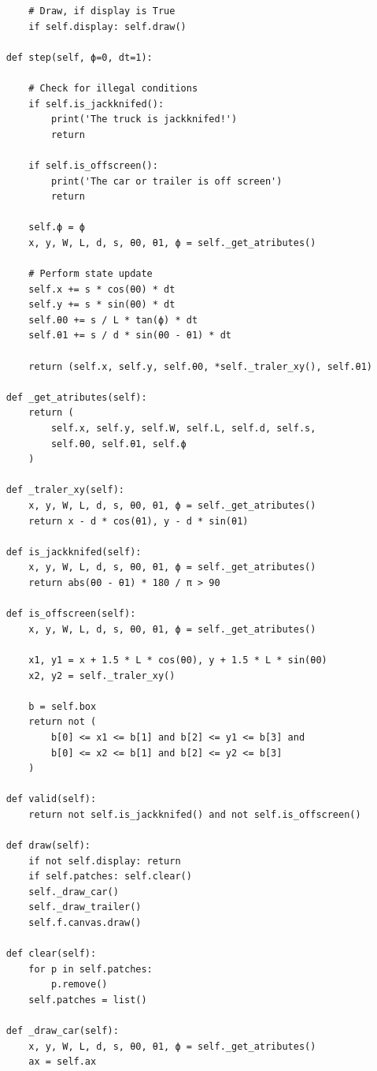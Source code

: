 \begin{verbatim}
        # Draw, if display is True
        if self.display: self.draw()
    
    def step(self, ϕ=0, dt=1):
        
        # Check for illegal conditions
        if self.is_jackknifed():
            print('The truck is jackknifed!')
            return
        
        if self.is_offscreen():
            print('The car or trailer is off screen')
            return
        
        self.ϕ = ϕ
        x, y, W, L, d, s, θ0, θ1, ϕ = self._get_atributes()
        
        # Perform state update
        self.x += s * cos(θ0) * dt
        self.y += s * sin(θ0) * dt
        self.θ0 += s / L * tan(ϕ) * dt
        self.θ1 += s / d * sin(θ0 - θ1) * dt
        
        return (self.x, self.y, self.θ0, *self._traler_xy(), self.θ1)
    
    def _get_atributes(self):
        return (
            self.x, self.y, self.W, self.L, self.d, self.s,
            self.θ0, self.θ1, self.ϕ
        )
    
    def _traler_xy(self):
        x, y, W, L, d, s, θ0, θ1, ϕ = self._get_atributes()
        return x - d * cos(θ1), y - d * sin(θ1)
        
    def is_jackknifed(self):
        x, y, W, L, d, s, θ0, θ1, ϕ = self._get_atributes()
        return abs(θ0 - θ1) * 180 / π > 90
    
    def is_offscreen(self):
        x, y, W, L, d, s, θ0, θ1, ϕ = self._get_atributes()
        
        x1, y1 = x + 1.5 * L * cos(θ0), y + 1.5 * L * sin(θ0)
        x2, y2 = self._traler_xy()
        
        b = self.box
        return not (
            b[0] <= x1 <= b[1] and b[2] <= y1 <= b[3] and
            b[0] <= x2 <= b[1] and b[2] <= y2 <= b[3]
        )
        
    def valid(self):
        return not self.is_jackknifed() and not self.is_offscreen()
        
    def draw(self):
        if not self.display: return
        if self.patches: self.clear()
        self._draw_car()
        self._draw_trailer()
        self.f.canvas.draw()
            
    def clear(self):
        for p in self.patches:
            p.remove()
        self.patches = list()
        
    def _draw_car(self):
        x, y, W, L, d, s, θ0, θ1, ϕ = self._get_atributes()
        ax = self.ax
        

\end{verbatim}
